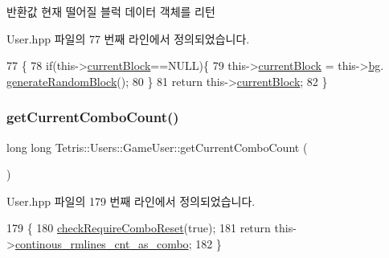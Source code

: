 \begin{DoxyReturn}{반환값}
현재 떨어질 블럭 데이터 객체를 리턴 
\end{DoxyReturn}


User.\+hpp 파일의 77 번째 라인에서 정의되었습니다.


\begin{DoxyCode}
77                                         \{
78                      \textcolor{keywordflow}{if}(this->\hyperlink{class_tetris_1_1_users_1_1_game_user_a65c4841efffdf4b6fbe8ac30fb2fb5d1}{currentBlock}==NULL)\{
79                         this->\hyperlink{class_tetris_1_1_users_1_1_game_user_a65c4841efffdf4b6fbe8ac30fb2fb5d1}{currentBlock} = this->\hyperlink{class_tetris_1_1_users_1_1_game_user_ad57a39d1716322764d92ff76f08ebcd5}{bg}.
      \hyperlink{class_tetris_1_1_block_generator_a10dfe1467d40437ad41c5ae76437ad78}{generateRandomBlock}();
80                     \}
81                     \textcolor{keywordflow}{return} this->\hyperlink{class_tetris_1_1_users_1_1_game_user_a65c4841efffdf4b6fbe8ac30fb2fb5d1}{currentBlock};
82                 \}
\end{DoxyCode}
\mbox{\label{class_tetris_1_1_users_1_1_game_user_a761f78f405c3d4445ae147b2c11e8364}} 
\subsubsection{\texorpdfstring{get\+Current\+Combo\+Count()}{getCurrentComboCount()}}
{\footnotesize\ttfamily long long Tetris\+::\+Users\+::\+Game\+User\+::get\+Current\+Combo\+Count (\begin{DoxyParamCaption}{ }\end{DoxyParamCaption})\hspace{0.3cm}{\ttfamily [inline]}}



User.\+hpp 파일의 179 번째 라인에서 정의되었습니다.


\begin{DoxyCode}
179                                             \{
180                 \hyperlink{class_tetris_1_1_users_1_1_game_user_a82ea0dfdb99643a1b577a22f5e504346}{checkRequireComboReset}(\textcolor{keyword}{true});
181                 \textcolor{keywordflow}{return} this->\hyperlink{class_tetris_1_1_users_1_1_game_user_a49692727d4018181845500b0ee765296}{continous\_rmlines\_cnt\_as\_combo};
182             \}
\end{DoxyCode}
\mbox{\label{class_tetris_1_1_users_1_1_game_user_a93bde8123ee0dc9333d62a44b904023c}} 
